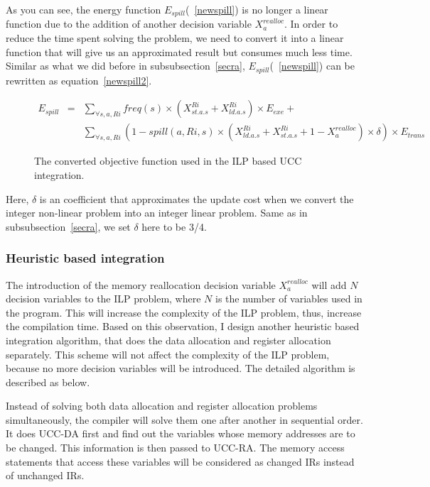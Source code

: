 As you can see, the energy function $E_{spill}$(~\ref{newspill}) is no longer a linear function
due to the addition of another decision variable $X_{a}^{realloc}$.
In order to reduce the time spent solving the problem, we need to convert
it into a linear function that will give us an approximated result but 
consumes much less time.
Similar as what we did before in subsubsection~\ref{secra}, $E_{spill}$(~\ref{newspill})
can be rewritten as equation~\ref{newspill2}.
\begin{figure}[ht]
\begin{small}
\begin{eqnarray}
E_{spill} &=& \sum_{\forall s, a, Ri}
freq(s) \times (X_{st.a.s}^{Ri}+X_{ld.a.s}^{Ri}) \times E_{exe} + \nonumber\\
					& & \sum_{\forall s, a, Ri}(1-spill(a,Ri,s)\times
 (X_{ld.a.s}^{Ri}+X_{st.a.s}^{Ri}+1-X_{a}^{realloc})\times \delta )\times E_{trans} \label{newspill2} 
\end{eqnarray}
\end{small}
\caption{The converted objective function used in the ILP based UCC integration.}
\label{newObj2}
\end{figure}

Here, $\delta$ is an coefficient that approximates the update cost when we 
convert the integer non-linear problem into an integer linear problem.
Same as in subsubsection~\ref{secra}, we set $\delta$ here to be 3/4.


\subsubsection{Heuristic based integration}

The introduction of the memory reallocation decision variable $X_{a}^{realloc}$ will add $N$ 
decision variables to the ILP problem, where $N$ is the number of variables used in the
program. This will increase the complexity of the ILP problem, thus, increase the
compilation time.
Based on this observation, I design another heuristic based integration algorithm, that
does the data allocation and register allocation separately. This scheme will not
affect the complexity of the ILP problem, because no more decision variables will be introduced.
The detailed algorithm is described as below.

Instead of solving both data allocation and register allocation problems simultaneously, 
the compiler will solve them one after another in sequential order. It does UCC-DA first and find out the variables 
whose 
memory addresses are to be changed. This information is then passed to UCC-RA. The memory access statements that
access these variables will be considered as changed IRs instead of unchanged IRs.

